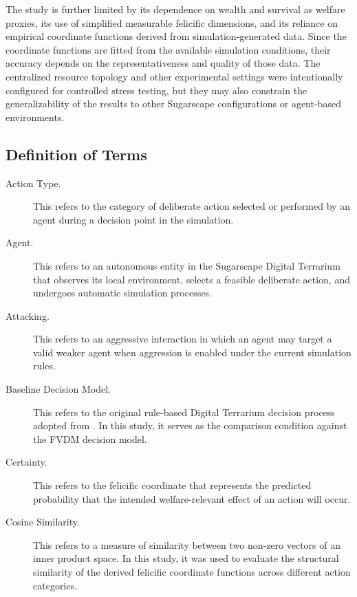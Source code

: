 \documentclass{icsthesis}
\begin{document}
\begin{mainmatter}
The study is further limited by its dependence on wealth and survival as welfare proxies, its use of simplified measurable felicific dimensions, and its reliance on empirical coordinate functions derived from simulation-generated data. Since the coordinate functions are fitted from the available simulation conditions, their accuracy depends on the representativeness and quality of those data. The centralized resource topology and other experimental settings were intentionally configured for controlled stress testing, but they may also constrain the generalizability of the results to other Sugarscape configurations or agent-based environments.

\newpage
			\subsection{Definition of Terms}

\begin{description}
\item[Action Type.] This refers to the category of deliberate action selected or performed by an agent during a decision point in the simulation.

\item[Agent.] This refers to an autonomous entity in the Sugarscape Digital Terrarium that observes its local environment, selects a feasible deliberate action, and undergoes automatic simulation processes.

\item[Attacking.] This refers to an aggressive interaction in which an agent may target a valid weaker agent when aggression is enabled under the current simulation rules.

\item[Baseline Decision Model.] This refers to the original rule-based Digital Terrarium decision process adopted from \citet{KremerHerman2024b}. In this study, it serves as the comparison condition against the FVDM decision model.

\item[Certainty.] This refers to the felicific coordinate that represents the predicted probability that the intended welfare-relevant effect of an action will occur.

\item[Cosine Similarity.] This refers to a measure of similarity between two non-zero vectors of an inner product space. In this study, it was used to evaluate the structural similarity of the derived felicific coordinate functions across different action categories.


\end{description}
\end{mainmatter}
\end{document}
